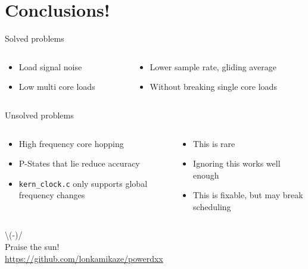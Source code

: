 \documentclass[aspectratio=169]{beamer}
\begin{document}
\section{Conclusions!}

\begin{frame}{Solved problems}
\begin{columns}[onlytextwidth]
\begin{column}{0.5\textwidth}
\begin{itemize}
\item<1-> Load signal noise
\item<3-> Low multi core loads
\end{itemize}
\end{column}
\begin{column}{0.5\textwidth}
\begin{itemize}
\item<2-> Lower sample rate, gliding average
\item<4-> Without breaking single core loads
\end{itemize}
\end{column}
\end{columns}
\end{frame}

\begin{frame}{Unsolved problems}
\begin{columns}[onlytextwidth]
\begin{column}{0.5\textwidth}
\begin{itemize}
\item<1-> High frequency core hopping
\item<3-> P-States that lie reduce accuracy
\item<5-> \lstinline{kern_clock.c} only supports global frequency changes
\end{itemize}
\end{column}
\begin{column}{0.5\textwidth}
\begin{itemize}
\item<2-> This is rare
\item<4-> Ignoring this works well enough
\item<6-> This is fixable, but may break scheduling
\end{itemize}
\end{column}
\end{columns}
\end{frame}

\begin{frame}
\centering
\textbackslash(-)/\\
Praise the sun!\\
\vspace{1cm}
\url{https://github.com/lonkamikaze/powerdxx}
\end{frame}
\end{document}
